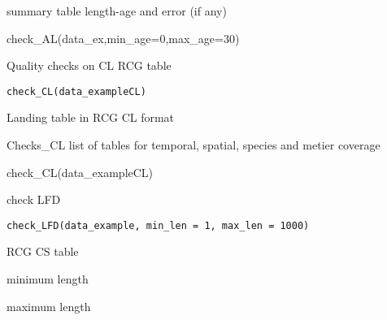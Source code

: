 \documentclass[a4paper]{book}
\begin{document}
%
\begin{Value}
summary table length-age and error (if any)
\end{Value}
%
\begin{Examples}
\begin{ExampleCode}
check_AL(data_ex,min_age=0,max_age=30)
\end{ExampleCode}
\end{Examples}
%
\begin{Description}\relax
Quality checks on CL RCG table
\end{Description}
%
\begin{Usage}
\begin{verbatim}
check_CL(data_exampleCL)
\end{verbatim}
\end{Usage}
%
\begin{Arguments}
\begin{ldescription}
\item[\code{data\_exampleCL}] Landing table in RCG CL format
\end{ldescription}
\end{Arguments}
%
\begin{Value}
Checks\_CL list of tables for temporal, spatial, species and metier coverage
\end{Value}
%
\begin{Examples}
\begin{ExampleCode}
check_CL(data_exampleCL)
\end{ExampleCode}
\end{Examples}
%
\begin{Description}\relax
check LFD
\end{Description}
%
\begin{Usage}
\begin{verbatim}
check_LFD(data_example, min_len = 1, max_len = 1000)
\end{verbatim}
\end{Usage}
%
\begin{Arguments}
\begin{ldescription}
\item[\code{data\_example}] RCG CS table

\item[\code{min\_len}] minimum length

\item[\code{max\_len}] maximum length
\end{ldescription}
\end{Arguments}
\end{document}
